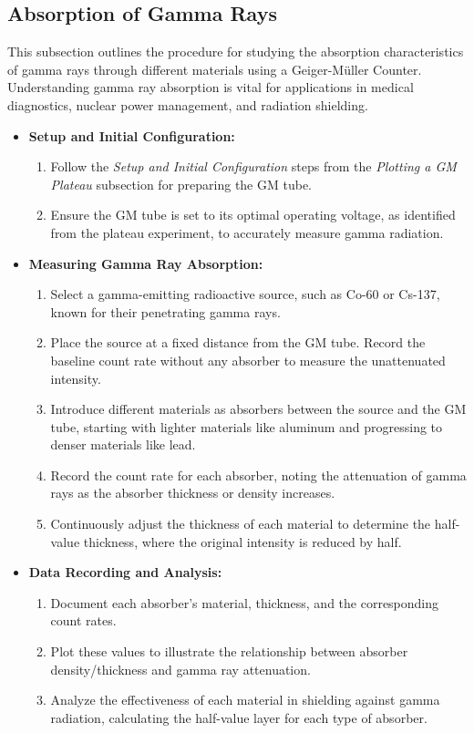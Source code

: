 \documentclass[11pt]{article}
\begin{document}
	\subsection{Absorption of Gamma Rays}
	
	This subsection outlines the procedure for studying the absorption characteristics of gamma rays through different materials using a Geiger-Müller Counter. Understanding gamma ray absorption is vital for applications in medical diagnostics, nuclear power management, and radiation shielding.
	
	\begin{itemize}
		\item \textbf{Setup and Initial Configuration:}
		\begin{enumerate}
			\item Follow the \textit{Setup and Initial Configuration} steps from the \textit{Plotting a GM Plateau} subsection for preparing the GM tube.
			\item Ensure the GM tube is set to its optimal operating voltage, as identified from the plateau experiment, to accurately measure gamma radiation.
		\end{enumerate}
		
		\item \textbf{Measuring Gamma Ray Absorption:}
		\begin{enumerate}
			\item Select a gamma-emitting radioactive source, such as Co-60 or Cs-137, known for their penetrating gamma rays.
			\item Place the source at a fixed distance from the GM tube. Record the baseline count rate without any absorber to measure the unattenuated intensity.
			\item Introduce different materials as absorbers between the source and the GM tube, starting with lighter materials like aluminum and progressing to denser materials like lead.
			\item Record the count rate for each absorber, noting the attenuation of gamma rays as the absorber thickness or density increases.
			\item Continuously adjust the thickness of each material to determine the half-value thickness, where the original intensity is reduced by half.
		\end{enumerate}
		
		\item \textbf{Data Recording and Analysis:}
		\begin{enumerate}
			\item Document each absorber's material, thickness, and the corresponding count rates.
			\item Plot these values to illustrate the relationship between absorber density/thickness and gamma ray attenuation.
			\item Analyze the effectiveness of each material in shielding against gamma radiation, calculating the half-value layer for each type of absorber.
		\end{enumerate}
		

\end{itemize}
\end{document}
